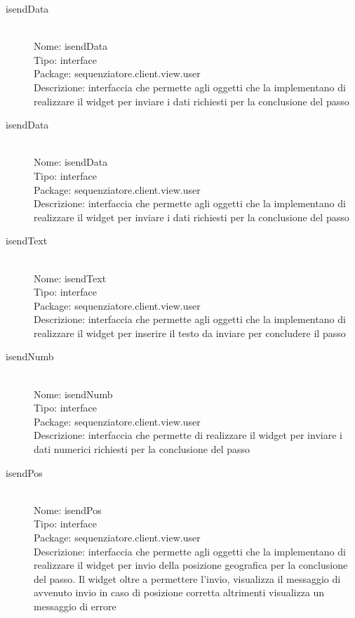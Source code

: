 \begin{description}
	\item[isendData] 
  	\hfill \\
  	Nome: isendData\\
  	Tipo: interface\\
	Package: sequenziatore.client.view.user\\
	Descrizione: interfaccia che permette agli oggetti che la implementano di realizzare il widget per inviare i dati richiesti per la conclusione del passo
\end{description}

\begin{description}
	\item[isendData] 
  	\hfill \\
  	Nome: isendData\\
  	Tipo: interface\\
	Package: sequenziatore.client.view.user\\
	Descrizione: interfaccia che permette agli oggetti che la implementano di realizzare il widget per inviare i dati richiesti per la conclusione del passo
\end{description}

\begin{description}
	\item[isendText] 
  	\hfill \\
  	Nome: isendText\\
  	Tipo: interface\\
	Package: sequenziatore.client.view.user\\
	Descrizione: interfaccia che permette agli oggetti che la implementano di realizzare il widget per inserire il testo da inviare per concludere il passo
\end{description}

\begin{description}
	\item[isendNumb] 
  	\hfill \\
  	Nome: isendNumb\\
  	Tipo: interface\\
	Package: sequenziatore.client.view.user\\
	Descrizione: interfaccia che permette di realizzare il widget per inviare i dati numerici richiesti per la conclusione del passo
\end{description}

\begin{description}
	\item[isendPos] 
  	\hfill \\
  	Nome: isendPos\\
  	Tipo: interface\\
	Package: sequenziatore.client.view.user\\
	Descrizione: interfaccia che permette agli oggetti che la implementano di realizzare il widget per invio della posizione geografica per la conclusione del passo. Il widget oltre a permettere l'invio, visualizza il messaggio di avvenuto invio in caso di posizione corretta altrimenti visualizza un messaggio di errore
\end{description}


